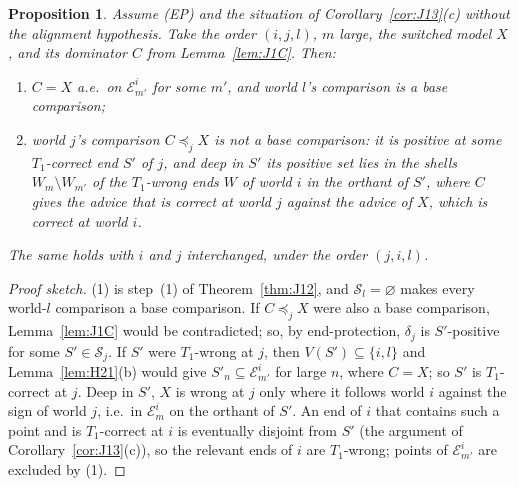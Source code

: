 \documentclass[11pt]{article}
\newtheorem{proposition}[theorem]{Proposition}
\theoremstyle{definition}
\theoremstyle{remark}
\begin{document}
\begin{proposition}\label{prop:J15}
Assume (EP) and the situation of Corollary~\ref{cor:J13}(c) without the alignment hypothesis. Take the order $(i,j,l)$, $m$ large, the switched model $X$, and its dominator $C$ from Lemma~\ref{lem:J1C}. Then:
\begin{enumerate}[leftmargin=*,label=(\arabic*)]
\item $C=X$ a.e.\ on $\mathcal E^i_{m'}$ for some $m'$, and world $l$'s comparison is a base comparison;
\item world $j$'s comparison $C\preceq_jX$ is not a base comparison: it is positive at some $T_1$-correct end $S'$ of $j$, and deep in $S'$ its positive set lies in the shells $W_m\setminus W_{m'}$ of the $T_1$-wrong ends $W$ of world $i$ in the orthant of $S'$, where $C$ gives the advice that is correct at world $j$ against the advice of $X$, which is correct at world $i$.
\end{enumerate}
The same holds with $i$ and $j$ interchanged, under the order $(j,i,l)$.
\end{proposition}
\begin{proof}[Proof sketch]
(1) is step~(1) of Theorem~\ref{thm:J12}, and $\mathcal S_l=\varnothing$ makes every world-$l$ comparison a base comparison. If $C\preceq_jX$ were also a base comparison, Lemma~\ref{lem:J1C} would be contradicted; so, by end-protection, $\delta_j$ is $S'$-positive for some $S'\in\mathcal S_j$. If $S'$ were $T_1$-wrong at $j$, then $V(S')\subseteq\{i,l\}$ and Lemma~\ref{lem:H21}(b) would give $S'_n\subseteq\mathcal E^i_{m'}$ for large $n$, where $C=X$; so $S'$ is $T_1$-correct at $j$. Deep in $S'$, $X$ is wrong at $j$ only where it follows world $i$ against the sign of world $j$, i.e.\ in $\mathcal E^i_m$ on the orthant of $S'$. An end of $i$ that contains such a point and is $T_1$-correct at $i$ is eventually disjoint from $S'$ (the argument of Corollary~\ref{cor:J13}(c)), so the relevant ends of $i$ are $T_1$-wrong; points of $\mathcal E^i_{m'}$ are excluded by (1).
\end{proof}
\end{document}
